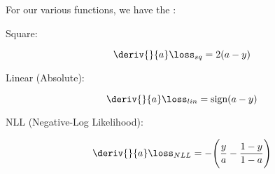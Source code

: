         \begin{notation}
            For our various  functions, we have the :
            
            Square:
            
            \begin{equation}
                \deriv{}{a} \loss_{sq} = 2(a-y)
            \end{equation}
            
            Linear (Absolute):
            
            \begin{equation}
                \deriv{}{a} \loss_{lin} = \text{sign}(a-y)
            \end{equation}
            
            NLL (Negative-Log Likelihood):
            
            \begin{equation}
                \deriv{}{a} \loss_{NLL} = - \Bigg( \frac{y}{a} - \frac{1-y}{1-a} \Bigg)
            \end{equation}
        \end{notation}
        